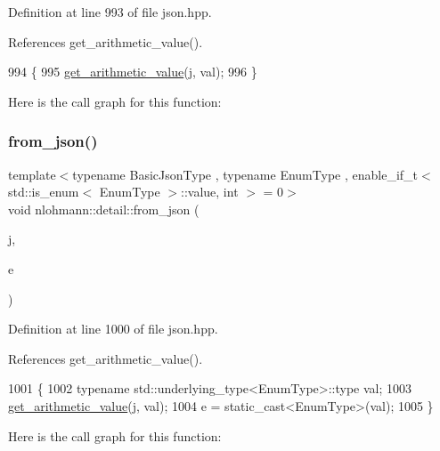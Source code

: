 Definition at line 993 of file json.\+hpp.



References get\+\_\+arithmetic\+\_\+value().


\begin{DoxyCode}
994 \{
995     \hyperlink{namespacenlohmann_1_1detail_a85955b9c6dd31846e4b8e891f78614b6}{get\_arithmetic\_value}(j, val);
996 \}
\end{DoxyCode}
Here is the call graph for this function\+:
\mbox{\label{namespacenlohmann_1_1detail_a5440d650150d01e8015133521351b459}} 
\subsubsection{\texorpdfstring{from\+\_\+json()}{from\_json()}\hspace{0.1cm}{\footnotesize\ttfamily [6/14]}}
{\footnotesize\ttfamily template$<$typename Basic\+Json\+Type , typename Enum\+Type , enable\+\_\+if\+\_\+t$<$ std\+::is\+\_\+enum$<$ Enum\+Type $>$\+::value, int $>$  = 0$>$ \\
void nlohmann\+::detail\+::from\+\_\+json (\begin{DoxyParamCaption}\item[{const Basic\+Json\+Type \&}]{j,  }\item[{Enum\+Type \&}]{e }\end{DoxyParamCaption})}



Definition at line 1000 of file json.\+hpp.



References get\+\_\+arithmetic\+\_\+value().


\begin{DoxyCode}
1001 \{
1002     \textcolor{keyword}{typename} std::underlying\_type<EnumType>::type val;
1003     \hyperlink{namespacenlohmann_1_1detail_a85955b9c6dd31846e4b8e891f78614b6}{get\_arithmetic\_value}(j, val);
1004     e = \textcolor{keyword}{static\_cast<}EnumType\textcolor{keyword}{>}(val);
1005 \}
\end{DoxyCode}
Here is the call graph for this function\+:
\mbox{\label{namespacenlohmann_1_1detail_abc62958462b916726b89f25fa381a129}} 
